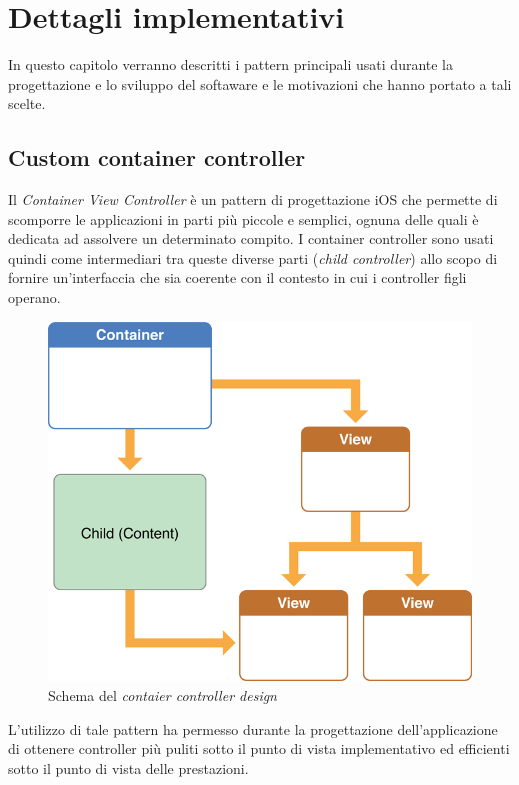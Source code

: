 \chapter{Dettagli implementativi}

In questo capitolo verranno descritti i pattern principali usati durante la progettazione e lo sviluppo del softaware e le motivazioni che hanno portato a tali scelte.

\section{Custom container controller}
Il \emph{Container View Controller} è un pattern di progettazione iOS che permette di scomporre le applicazioni in parti più piccole e semplici, ognuna delle quali è dedicata ad assolvere un determinato compito. I container controller sono usati quindi come intermediari tra queste diverse parti (\emph{child controller}) allo scopo di fornire un'interfaccia che sia coerente con il contesto in cui i controller figli operano.

\begin{figure}[!htbp]
\centering
\includegraphics[scale=0.30]{architettura/container.png}
\caption{Schema del \emph{contaier controller design}}
\label{fig:selettore}
\end{figure}

L'utilizzo di tale pattern ha permesso durante la progettazione dell'applicazione di ottenere controller più puliti sotto il punto di vista implementativo ed efficienti sotto il punto di vista delle prestazioni.

